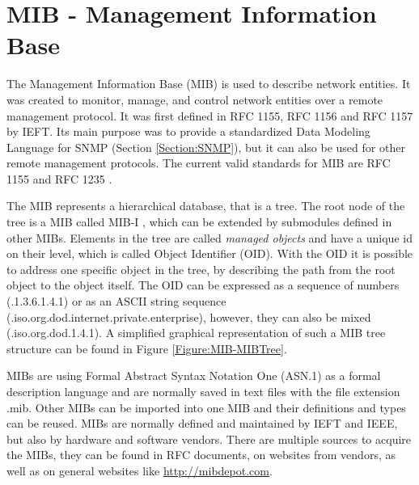 \section{MIB - Management Information Base}
\label{Section:MIB}

The Management Information Base (MIB) is used to describe network entities. It was created to monitor, manage, and control network entities over a remote management protocol. It was first defined in RFC 1155\cite{RFC:RFC1155:1990}, RFC 1156\cite{RFC:RFC1156:1990} and RFC 1157\cite{RFC:RFC1157:1990} by IEFT. Its main purpose was to provide a standardized Data Modeling Language for SNMP (Section \ref{Section:SNMP}), but it can also be used for other remote management protocols. The current valid standards for MIB are RFC 1155\cite{RFC:RFC1155:1990} and RFC 1235 \cite{RFC:RFC1213:1991}.

The MIB represents a hierarchical database, that is a tree. The root node of the tree is a MIB called MIB-I \cite{RFC:RFC1155:1990}, which can be extended by submodules defined in other MIBs. Elements in the tree are called \textit{managed objects} and have a unique id on their level, which is called Object Identifier (OID). With the OID it is possible to address one specific object in the tree, by describing the path from the root object to the object itself. The OID can be expressed as a sequence of numbers (.1.3.6.1.4.1) or as an ASCII string sequence (.iso.org.dod.internet.private.enterprise), however, they can also be mixed (.iso.org.dod.1.4.1). A simplified graphical representation of such a MIB tree structure can be found in Figure \ref{Figure:MIB-MIBTree}.

MIBs are using Formal Abstract Syntax Notation One (ASN.1)\cite{ISO:ISO8824-1:2015} as a formal description language and are normally saved in text files with the file extension .mib. Other MIBs can be imported into one MIB and their definitions and types can be reused. MIBs are normally defined and maintained by IEFT and IEEE, but also by hardware and software vendors. There are multiple sources to acquire the MIBs, they can be found in RFC documents, on websites from vendors, as well as on general websites like \url{http://mibdepot.com}.


